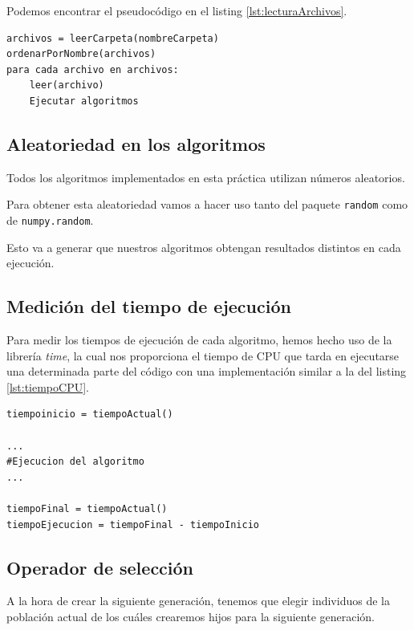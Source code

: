 Podemos encontrar el pseudocódigo en el listing \ref{lst:lecturaArchivos}.

\begin{lstlisting}[frame=single, caption={Versión búsqueda local}, captionpos=b, label=lst:lecturaArchivos]
archivos = leerCarpeta(nombreCarpeta)
ordenarPorNombre(archivos)
para cada archivo en archivos:
    leer(archivo)
    Ejecutar algoritmos
\end{lstlisting}


\subsection{Aleatoriedad en los algoritmos}

Todos los algoritmos implementados en esta práctica utilizan números aleatorios.

Para obtener esta aleatoriedad vamos a hacer uso tanto del paquete \texttt{random} como de \texttt{numpy.random}.

Esto va a generar que nuestros algoritmos obtengan resultados distintos en cada ejecución.

\subsection{Medición del tiempo de ejecución}

Para medir los tiempos de ejecución de cada algoritmo, hemos hecho uso de la librería \textit{time}, la cual nos proporciona el tiempo de CPU que tarda en ejecutarse una determinada parte del código con una implementación similar a la del listing \ref{lst:tiempoCPU}.

\begin{lstlisting}[frame=single, caption={Tiempo de ejecución de un programa}, captionpos=b, label=lst:tiempoCPU]
tiempoinicio = tiempoActual()

...
#Ejecucion del algoritmo
...

tiempoFinal = tiempoActual()
tiempoEjecucion = tiempoFinal - tiempoInicio
\end{lstlisting}

\subsection{Operador de selección}

A la hora de crear la siguiente generación, tenemos que elegir individuos de la población actual de los cuáles crearemos hijos para la siguiente generación.

